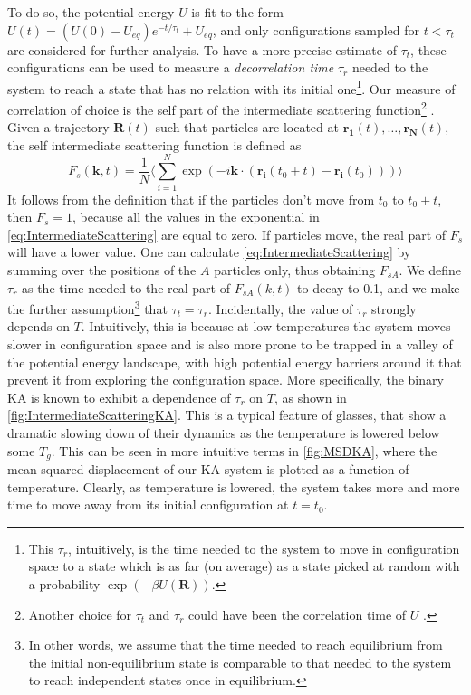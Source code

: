 To do so, the potential energy $U$ is fit to the form $U(t) = (U(0) - U_{eq}) e^{-t/\tau_{t}} + U_{eq}$, and only configurations sampled for $t < \tau_{t}$ are considered for further analysis.
To have a more precise estimate of $\tau_{t}$, these configurations can be used to measure a \emph{decorrelation time} $\tau_{r}$ needed to the system to reach a state that has no relation with its initial one\footnote{This $\tau_{r}$, intuitively, is the time needed to the system to move in configuration space to a state which is as far (on average) as a state picked at random with a probability $\exp(-\beta U(\mathbf{R}))$.}.
Our measure of correlation of choice is the self part of the intermediate scattering function\footnote{Another choice for $\tau_{t}$ and $\tau_{r}$ could have been the correlation time of $U$ \cite{statfor, allen1989computer}.} \cite{hansen1990theory, schroder2000crossover}. 
Given a trajectory $\mathbf{R}(t)$ such that particles are located at $\mathbf{r_{1}}(t), \mathbf{\ldots}, \mathbf{r_{N}}(t)$, the self intermediate scattering function is defined as
\begin{equation}
	F_{s}(\mathbf{k}, t) = \frac{1}{N} \langle \sum_{i=1}^{N} \exp(-i \mathbf{k} \cdot (\mathbf{r_{i}}(t_{0} + t) - \mathbf{r_{i}}(t_{0}))) \rangle 
	\label{eq:IntermediateScattering}
\end{equation}
It follows from the definition that if the particles don't move from $t_{0}$ to $t_{0} + t$, then $F_{s} = 1$, because all the values in the exponential in \autoref{eq:IntermediateScattering} are equal to zero. If particles move, the real part of $F_{s}$ will have a lower value. One can calculate \autoref{eq:IntermediateScattering}  by summing over the positions of the $A$ particles only, thus obtaining $F_{sA}$.
We define $\tau_{r}$ as the time needed to the real part of $F_{sA}(k, t)$ to decay to 0.1, and we make the further assumption\footnote{In other words, we assume that the time needed to reach equilibrium from the initial non-equilibrium state is comparable to that needed to the system to reach independent states once in equilibrium.} that $\tau_{t} = \tau_{r}$.
Incidentally, the value of $\tau_{r}$ strongly depends on $T$. Intuitively, this is because at low temperatures the system moves slower in configuration space and is also more prone to be trapped in a valley of the potential energy landscape, with high potential energy barriers around it that prevent it from exploring the configuration space. More specifically, the binary KA is known to exhibit a dependence of $\tau_{r}$ on $T$, as shown in \autoref{fig:IntermediateScatteringKA}. This is a typical feature of glasses, that show a dramatic slowing down of their dynamics as the temperature is lowered below some $T_{g}$. This can be seen in more intuitive terms in \autoref{fig:MSDKA}, where the mean squared displacement of our KA system is plotted as a function of temperature. Clearly, as temperature is lowered, the system takes more and more time to move away from its initial configuration at $t=t_{0}$.

